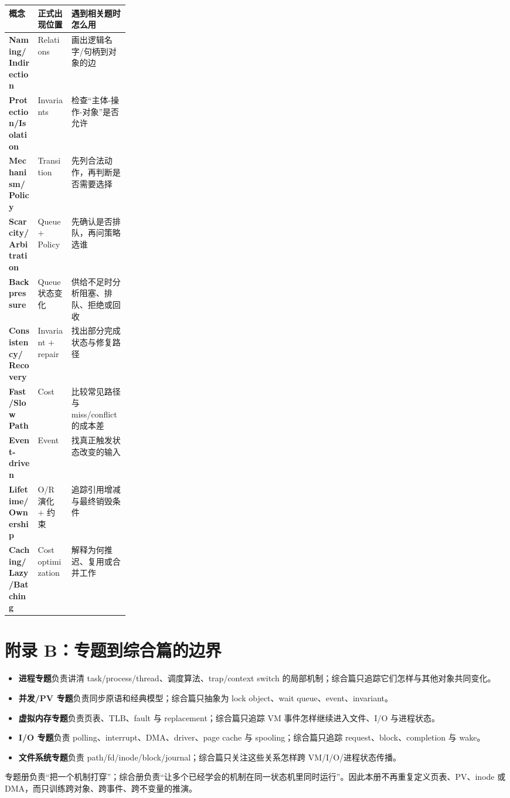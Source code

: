 \documentclass[11pt,a4paper]{ctexart}
\newcommand{\kw}[1]{\textbf{#1}}
\begin{document}
\begin{center}
\small
\begin{tabularx}{\linewidth}{>{\bfseries}p{0.24\linewidth} X X}
\toprule
概念 & 正式出现位置 & 遇到相关题时怎么用 \\
\midrule
Naming/Indirection & Relations & 画出逻辑名字/句柄到对象的边 \\
Protection/Isolation & Invariants & 检查“主体-操作-对象”是否允许 \\
Mechanism/Policy & Transition & 先列合法动作，再判断是否需要选择 \\
Scarcity/Arbitration & Queue + Policy & 先确认是否排队，再问策略选谁 \\
Backpressure & Queue 状态变化 & 供给不足时分析阻塞、排队、拒绝或回收 \\
Consistency/Recovery & Invariant + repair & 找出部分完成状态与修复路径 \\
Fast/Slow Path & Cost & 比较常见路径与 miss/conflict 的成本差 \\
Event-driven & Event & 找真正触发状态改变的输入 \\
Lifetime/Ownership & O/R 演化 + 约束 & 追踪引用增减与最终销毁条件 \\
Caching/Lazy/Batching & Cost optimization & 解释为何推迟、复用或合并工作 \\
\bottomrule
\end{tabularx}
\end{center}

\section{附录 B：专题到综合篇的边界}

\begin{itemize}
  \item \kw{进程专题}负责讲清 task/process/thread、调度算法、trap/context switch 的局部机制；综合篇只追踪它们怎样与其他对象共同变化。
  \item \kw{并发/PV 专题}负责同步原语和经典模型；综合篇只抽象为 lock object、wait queue、event、invariant。
  \item \kw{虚拟内存专题}负责页表、TLB、fault 与 replacement；综合篇只追踪 VM 事件怎样继续进入文件、I/O 与进程状态。
  \item \kw{I/O 专题}负责 polling、interrupt、DMA、driver、page cache 与 spooling；综合篇只追踪 request、block、completion 与 wake。
  \item \kw{文件系统专题}负责 path/fd/inode/block/journal；综合篇只关注这些关系怎样跨 VM/I/O/进程状态传播。
\end{itemize}

\begin{method}[本册的唯一功能]
专题册负责“把一个机制打穿”；综合册负责“让多个已经学会的机制在同一状态机里同时运行”。因此本册不再重复定义页表、PV、inode 或 DMA，而只训练跨对象、跨事件、跨不变量的推演。
\end{method}
\end{document}
